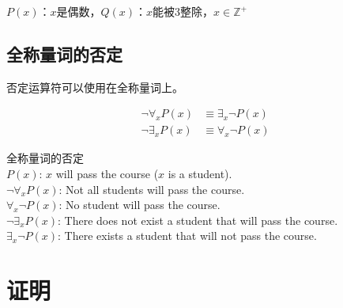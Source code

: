 \begin{tcolorbox}
	$ P(x) $：$ x $是偶数，$ Q(x) $：$ x $能被3整除，$ x \in \mathbb{Z}^+ $
	\begin{table}[H]
		\centering
	\end{table}
\end{tcolorbox}

\vspace{0.5cm}

\subsection{全称量词的否定}

否定运算符可以使用在全称量词上。

\vspace{-1cm}

\begin{align}
	\neg \forall_x P(x) & \equiv \exists_x \neg P(x) \\
	\neg \exists_x P(x) & \equiv \forall_x \neg P(x)
\end{align}

\begin{tcolorbox}
	全称量词的否定\\
	$ P(x) $: $ x $ will pass the course ($ x $ is a student).\\
	$ \neg \forall_x P(x) $: Not all students will pass the course.\\
	$ \forall_x \neg P(x) $: No student will pass the course.\\
	$ \neg \exists_x P(x) $: There does not exist a student that will pass the course.\\
	$ \exists_x \neg P(x) $: There exists a student that will not pass the course.
\end{tcolorbox}

\newpage

\section{证明}

